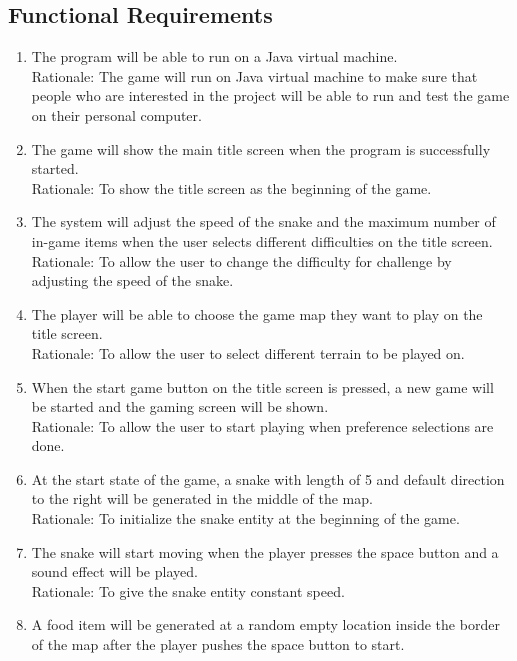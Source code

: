 \documentclass[12pt, titlepage]{article}
\begin{document}
\subsection{Functional Requirements}
\begin{enumerate}[{FR}1.]
    \item The program will be able to run on a Java virtual machine.\\
        \color{red} Rationale: The game will run on Java virtual machine to make sure that people who are interested in the project will be able to run and test the game on their personal computer.\color{black}
    \item The game will show the main title screen when the program is successfully started.\\
        \color{red} Rationale: To show the title screen as the beginning of the game.\color{black}
    \item The system will adjust the speed of the snake and the maximum number of in-game items when the user selects different difficulties on the title screen.\\
        \color{red} Rationale: To allow the user to change the difficulty for challenge by adjusting the speed of the snake.\color{black}
    \item The player will be able to choose the game map they want to play on the title screen.\\
        \color{red} Rationale: To allow the user to select different terrain to be played on. \color{black}
    \item When the start game button on the title screen is pressed, a new game will be started and the gaming screen will be shown.\\
        \color{red} Rationale: To allow the user to start playing when preference selections are done. \color{black}
    \item At the start state of the game, a snake with length of 5 and default direction to the right will be generated in the middle of the map.\\
        \color{red} Rationale: To initialize the snake entity at the beginning of the game. \color{black}
    \item The snake will start moving when the player presses the space button and a sound effect will be played.\\
        \color{red} Rationale: To give the snake entity constant speed. \color{black}
    \item A food item will be generated at a random empty location inside the border of the map after the player pushes the space button to start.\\

\end{enumerate}
\end{document}
